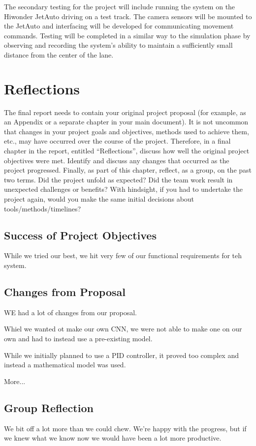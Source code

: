 \documentclass[titlepage]{article}
\begin{document}
The secondary testing for the project will include running the system on the Hiwonder JetAuto driving on a test track. The camera sensors will be mounted to the JetAuto and interfacing will be developed for communicating movement commands. Testing will be completed in a similar way to the simulation phase by observing and recording the system’s ability to maintain a sufficiently small distance from the center of the lane. 


\section{Reflections}

The final report needs to contain your original project proposal
(for example, as an Appendix or a separate chapter in your main
document). It is not uncommon that changes in your project goals
and objectives, methods used to achieve them, etc., may have
occurred over the course of the project. Therefore, in a final
chapter in the report, entitled “Reflections”, discuss how well
the original project objectives were met. Identify and discuss any
changes that occurred as the project progressed. Finally, as part
of this chapter, reflect, as a group, on the past two terms. Did
the project unfold as expected? Did the team work result in unexpected
challenges or benefits? With hindsight, if you had to undertake the
project again, would you make the same initial decisions about
tools/methods/timelines?

\subsection{Success of Project Objectives}

While we tried our best, we hit very few of our functional requirements for teh system.

\subsection{Changes from Proposal}

WE had a lot of changes from our proposal. 

Whiel we wanted ot make our own CNN, we were not able to make one on our own and had to instead use a pre-existing model.

While we initially planned to use a PID controller, it proved too complex and instead a mathematical model was used.

More...

\subsection{Group Reflection}

We bit off a lot more than we could chew. We're happy with the progress, but if we knew what we know now we would have been a lot more productive.

\begin{thebibliography}{00}
\end{thebibliography}
\vspace{12pt}
\color{red}

\appendix
\end{document}
